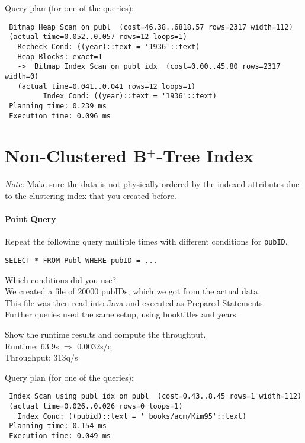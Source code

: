 \documentclass[11pt]{scrartcl}
\begin{document}
\smallskip\noindent
Query plan (for one of the queries):
{\small
\begin{verbatim}
 Bitmap Heap Scan on publ  (cost=46.38..6818.57 rows=2317 width=112)
 (actual time=0.052..0.057 rows=12 loops=1)
   Recheck Cond: ((year)::text = '1936'::text)
   Heap Blocks: exact=1
   ->  Bitmap Index Scan on publ_idx  (cost=0.00..45.80 rows=2317 width=0)
   (actual time=0.041..0.041 rows=12 loops=1)
         Index Cond: ((year)::text = '1936'::text)
 Planning time: 0.239 ms
 Execution time: 0.096 ms
\end{verbatim}
}

\section{Non-Clustered B$^+$-Tree Index}

\noindent \emph{Note:} Make sure the data is not physically ordered by
the indexed attributes due to the clustering index that you created
before.

\paragraph{Point Query}

Repeat the following query multiple times with different conditions for {\tt pubID}.

{\small
\begin{verbatim}
SELECT * FROM Publ WHERE pubID = ...
\end{verbatim}
}

\noindent
Which conditions did you use?\\
We created a file of 20000 pubIDs, which we got from the actual data.\\
This file was then read into Java and executed as Prepared Statements.\\
Further queries used the same setup, using booktitles and years.

\smallskip\noindent
Show the runtime results and compute the throughput.\\
Runtime: 63.9s $\Rightarrow$ 0.0032s/q\\
Throughput: 313q/s

\smallskip\noindent
Query plan (for one of the queries):
{\small
\begin{verbatim}
 Index Scan using publ_idx on publ  (cost=0.43..8.45 rows=1 width=112)
 (actual time=0.026..0.026 rows=0 loops=1)
   Index Cond: ((pubid)::text = ' books/acm/Kim95'::text)
 Planning time: 0.154 ms
 Execution time: 0.049 ms
\end{verbatim}
}
\end{document}
